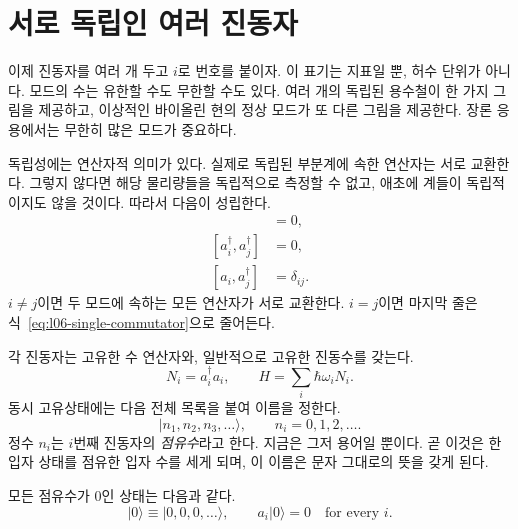 \section{서로 독립인 여러 진동자}

이제 진동자를 여러 개 두고 \(i\)로 번호를 붙이자. 이 표기는 지표일 뿐, 허수 단위가 아니다. 모드의 수는 유한할 수도 무한할 수도 있다. 여러 개의 독립된 용수철이 한 가지 그림을 제공하고, 이상적인 바이올린 현의 정상 모드가 또 다른 그림을 제공한다. 장론 응용에서는 무한히 많은 모드가 중요하다.

독립성에는 연산자적 의미가 있다. 실제로 독립된 부분계에 속한 연산자는 서로 교환한다. 그렇지 않다면 해당 물리량들을 독립적으로 측정할 수 없고, 애초에 계들이 독립적이지도 않을 것이다. 따라서 다음이 성립한다.
\begin{align}
[a_i,a_j]&=0, \\
[a_i^\dagger,a_j^\dagger]&=0, \\
[a_i,a_j^\dagger]&=\delta_{ij}.
\label{eq:l06-many-commutators}
\end{align}
\(i\ne j\)이면 두 모드에 속하는 모든 연산자가 서로 교환한다. \(i=j\)이면 마지막 줄은 식~\eqref{eq:l06-single-commutator}으로 줄어든다.

각 진동자는 고유한 수 연산자와, 일반적으로 고유한 진동수를 갖는다.
\begin{equation}
N_i=a_i^\dagger a_i,
\qquad
H=\sum_i\hbar\omega_i N_i.
\label{eq:l06-many-hamiltonian}
\end{equation}
동시 고유상태에는 다음 전체 목록을 붙여 이름을 정한다.
\begin{equation}
|n_1,n_2,n_3,\ldots\rangle,
\qquad n_i=0,1,2,\ldots.
\label{eq:l06-occupation-ket}
\end{equation}
정수 \(n_i\)는 \(i\)번째 진동자의 \emph{점유수}라고 한다. 지금은 그저 용어일 뿐이다. 곧 이것은 한 입자 상태를 점유한 입자 수를 세게 되며, 이 이름은 문자 그대로의 뜻을 갖게 된다.

모든 점유수가 0인 상태는 다음과 같다.
\begin{equation}
|0\rangle\equiv|0,0,0,\ldots\rangle,
\qquad a_i|0\rangle=0\quad\text{for every }i.
\label{eq:l06-oscillator-vacuum}
\end{equation}

\begin{classroomqa}\end{classroomqa}

